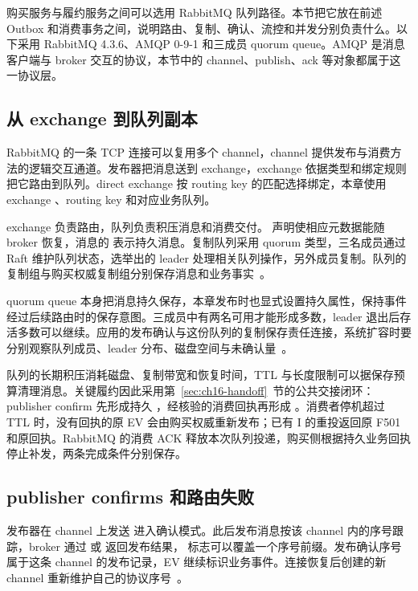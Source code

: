 购买服务与履约服务之间可以选用 RabbitMQ 队列路径。本节把它放在前述 Outbox 和消费事务之间，说明路由、复制、确认、流控和并发分别负责什么。以下采用 RabbitMQ 4.3.6、AMQP 0-9-1 和三成员 quorum queue。AMQP 是消息客户端与 broker 交互的协议，本节中的 channel、publish、ack 等对象都属于这一协议层。

\subsection{从 exchange 到队列副本}

RabbitMQ 的一条 TCP 连接可以复用多个 channel，channel 提供发布与消费方法的逻辑交互通道。发布器把消息送到 exchange，exchange 依据类型和绑定规则把它路由到队列。direct exchange 按 routing key 的匹配选择绑定，本章使用 exchange 、routing key  和对应业务队列。


exchange 负责路由，队列负责积压消息和消费交付。 声明使相应元数据能随 broker 恢复，消息的  表示持久消息。复制队列采用 quorum 类型，三名成员通过 Raft 维护队列状态，选举出的 leader 处理相关队列操作，另外成员复制。队列的复制组与购买权威复制组分别保存消息和业务事实~\cite{rabbitmq-queues,rabbitmq-quorum-queues}。

quorum queue 本身把消息持久保存，本章发布时也显式设置持久属性，保持事件经过后续路由时的保存意图。三成员中有两名可用才能形成多数，leader 退出后存活多数可以继续。应用的发布确认与这份队列的复制保存责任连接，系统扩容时要分别观察队列成员、leader 分布、磁盘空间与未确认量~\cite{rabbitmq-quorum-queues}。

队列的长期积压消耗磁盘、复制带宽和恢复时间，TTL 与长度限制可以据保存预算清理消息。关键履约因此采用第~\ref{sec:ch16-handoff}~节的公共交接闭环：publisher confirm 先形成持久 ，经核验的消费回执再形成 。消费者停机超过 TTL 时，没有回执的原 EV 会由购买权威重新发布；已有 I 的重投返回原 F501 和原回执。RabbitMQ 的消费 ACK 释放本次队列投递，购买侧根据持久业务回执停止补发，两条完成条件分别保存。

\subsection{publisher confirms 和路由失败}

发布器在 channel 上发送  进入确认模式。此后发布消息按该 channel 内的序号跟踪，broker 通过  或  返回发布结果， 标志可以覆盖一个序号前缀。发布确认序号属于这条 channel 的发布记录，EV 继续标识业务事件。连接恢复后创建的新 channel 重新维护自己的协议序号~\cite{rabbitmq-confirms}。


